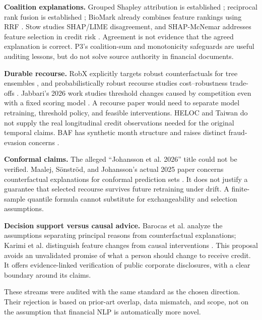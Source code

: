 \documentclass[11pt,a4paper]{article}
\newcommand{\pbreak}{\clearpage}
\newcommand{\lead}[1]{\textbf{\color{navy}#1}}
\begin{document}
\lead{Coalition explanations.} Grouped Shapley attribution is established \cite{groupshapley}; reciprocal rank fusion is established \cite{rrf}; BioMark already combines feature rankings using RRF \cite{biomark}. Stow studies SHAP/LIME disagreement, and SHAP-McNemar addresses feature selection in credit risk \cite{stow,shapmcnemar}. Agreement is not evidence that the agreed explanation is correct. P3's coalition-sum and monotonicity safeguards are useful auditing lessons, but do not solve source authority in financial documents.

\lead{Durable recourse.} RobX explicitly targets robust counterfactuals for tree ensembles \cite{dutta}, and probabilistically robust recourse studies cost--robustness trade-offs \cite{pawelczyk}. Jabbari's 2026 work studies threshold changes caused by competition even with a fixed scoring model \cite{jabbari}. A recourse paper would need to separate model retraining, threshold policy, and feasible interventions. HELOC and Taiwan do not supply the real longitudinal credit observations needed for the original temporal claims. BAF has synthetic month structure and raises distinct fraud-evasion concerns \cite{baf}.

\lead{Conformal claims.} The alleged “Johansson et al. 2026” title could not be verified. Maalej, Sönströd, and Johansson's actual 2025 paper concerns counterfactual explanations for conformal prediction sets \cite{maalej}. It does not justify a guarantee that selected recourse survives future retraining under drift. A finite-sample quantile formula cannot substitute for exchangeability and selection assumptions.

\lead{Decision support versus causal advice.} Barocas et al. analyze the assumptions separating principal reasons from counterfactual explanations; Karimi et al. distinguish feature changes from causal interventions \cite{barocas,karimi}. This proposal avoids an unvalidated promise of what a person should change to receive credit. It offers evidence-linked verification of public corporate disclosures, with a clear boundary around its claims.

These streams were audited with the same standard as the chosen direction. Their rejection is based on prior-art overlap, data mismatch, and scope, not on the assumption that financial NLP is automatically more novel.

\pbreak
\end{document}
